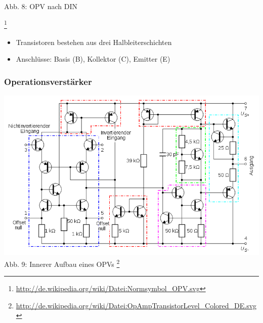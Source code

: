 \begin{frame}
\begin{minipage}{0.4\textwidth}
	Abb. 8: OPV nach DIN
\end{minipage}
\footnote{\url{http://de.wikipedia.org/wiki/Datei:Normsymbol_OPV.svg}}
\vspace{0.5cm}
\begin{center}
\begin{itemize}
	\item Transistoren bestehen aus drei Halbleiterschichten
	\item Anschlüsse: Basis (B), Kollektor (C), Emitter (E)
\end{itemize}
\end{center}
\end{frame}

\begin{frame}
\frametitle{Operationsverstärker}
\begin{center}
	\includegraphics[scale=0.35]{e13/OPV-intern.png}\\
	Abb. 9: Innerer Aufbau eines OPVs
	\footnote{\url{http://de.wikipedia.org/wiki/Datei:OpAmpTransistorLevel_Colored_DE.svg}}
\end{center}
\end{frame}

